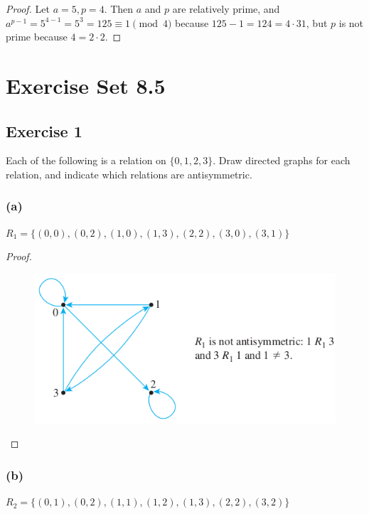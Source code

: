 \documentclass[14pt]{extarticle}
\begin{document}
\begin{proof}
Let \(a = 5, p = 4\). Then $a$ and $p$ are relatively prime, and \(a^{p-1} = 5^{4-1}=5^3 = 125 \equiv 1 \pmod 4\)
because \(125 - 1 = 124 = 4 \cdot 31\), but $p$ is not prime because \(4 = 2 \cdot 2\).
\end{proof}

\section{Exercise Set 8.5}

\subsection{Exercise 1}
Each of the following is a relation on \(\{0, 1, 2, 3\}\). Draw directed graphs for each relation, and indicate which 
relations are antisymmetric.

\subsubsection{(a)}
\(R_1 = \{(0, 0), (0, 2), (1, 0), (1, 3), (2, 2), (3, 0), (3, 1)\}\)

\begin{proof}
\begin{figure}[ht!]
\centering
\includegraphics[scale=0.5]{../images/8.5.1.a.png}
\end{figure}
\end{proof}

\subsubsection{(b)}
\(R_2 = \{(0, 1), (0, 2), (1, 1), (1, 2), (1, 3), (2, 2), (3, 2)\}\)
\end{document}
